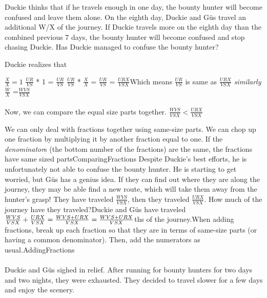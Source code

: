 \documentclass[a4paper,11pt ]{book}
\begin{document}
{Duckie thinks that if he travels enough in one day, the bounty hunter will become confused and leave them alone. On the eighth day, Duckie and Güs travel an additional W/X of the journey. If Duckie travels more on the eighth day than the combined previous 7 days, the bounty hunter will become confused and stop chasing Duckie. Has Duckie managed to confuse the bounty hunter?}{Duckie realizes that \begin{center}
    $\frac{X}{X}=1$ \linebreak
    $\frac{UR}{VS}$ * 1 = $\frac{UR}{VS}$ \linebreak
    $\frac{UR}{VS}$ * $\frac{X}{X}$ = $\frac{UR}{VS}$ = $\frac{URX}{VSX}$\linebreak  Which means $\frac{UR}{VS}$  is same as  $\frac{URX}{VSX}$ \linebreak\linebreak
    \textit{similarly}
    $\frac{W}{X}$ =$\frac{WVS}{VSX}$
\end{center}
\paragraph{} Now, we can compare the equal size parts together. $\frac{WVS}{VSX} < \frac{URX}{VSX}$}{We can only deal with fractions together using same-size parts. We can chop up one fraction by multiplying it by another fraction equal to one. If the \textit{denominator}s (the bottom number of the fractions) are the same, the fractions have same sized parts}{ComparingFractions}
{Despite Duckie's best efforts, he is unfortunately not able to confuse the bounty hunter. He is starting to get worried, but Güs has a genius idea. If they can find out where they are along the journey, they may be able find a new route, which will take them away from the hunter's grasp! They have traveled $\frac{WVS}{VSX}$, then they traveled $\frac{URX}{VSX}$. How much of the journey have they traveled?}{Duckie and Güs have traveled
$\frac{WVS}{VSX}+\frac{URX}{VSX}\linebreak=\frac{WVS+URX}{VSX}\linebreak=\frac{WVS+URX}{VSX}$ths of the journey.}{When adding fractions, break up each fraction so that they are in terms of same-size parts (or having a common denominator). Then, add the numerators as usual.}{AddingFractions}
\paragraph{} Duckie and Güs sighed in relief. After running for bounty hunters for two days and two nights, they were exhausted. They decided to travel slower for a few days and enjoy the scenery. 
\end{document}
